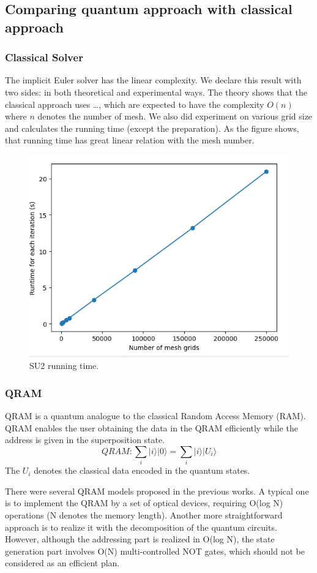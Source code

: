 \documentclass[%
 reprint,
 amsmath,amssymb,
pra,
]{revtex4-1}
\begin{document}
\subsection{Comparing quantum approach with classical approach}

\subsubsection{Classical Solver}


The implicit Euler solver has the linear complexity. We declare this result with two sides: in both theoretical and experimental ways. The theory shows that the classical approach uses …, which are expected to have the complexity $O(n)$ where $n$ denotes the number of mesh. We also did experiment on various grid size and calculates the running time (except the preparation). As the figure shows, that running time has great linear relation with the mesh number.
\begin{figure} 
\centering
\includegraphics[width=.48\linewidth]{Fig/su2_speed.png}
\caption{SU2 running time.} \label{su2Speed}
\end{figure} 


\subsubsection{QRAM}
 

QRAM is a quantum analogue to the classical Random Access Memory (RAM). QRAM enables the user obtaining the data in the QRAM efficiently while the address is given in the superposition state. 
$$
QRAM: \sum_i{|i\rangle|0\rangle}=\sum_i{|i\rangle|U_i\rangle}
$$
The $U_i$ denotes the classical data encoded in the quantum states.

There were several QRAM models proposed in the previous works. A typical one is to implement the QRAM by a set of optical devices, requiring O(log N) operations (N denotes the memory length). Another more straightforward approach is to realize it with the decomposition of the quantum circuits. However, although the addressing part is realized in O(log N), the state generation part involves O(N) multi-controlled NOT gates, which should not be considered as an efficient plan.
\end{document}
